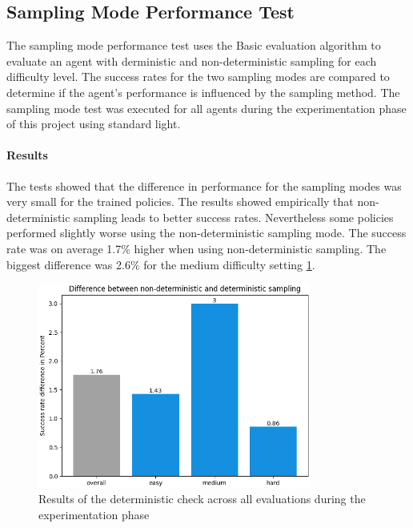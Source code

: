 \subsection{Sampling Mode Performance Test}
\label{ref:sampling_mode_test_results}

The sampling mode performance test uses the Basic evaluation algorithm to evaluate an agent with derministic and non-deterministic sampling for each difficulty level. The success rates for the two sampling modes are compared to determine if the agent's performance is influenced by the sampling method. The sampling mode test was executed for all agents during the experimentation phase of this project using standard light.

\paragraph{Results}
The tests showed that the difference in performance for the sampling modes was very small for the trained policies. The results showed empirically that non-deterministic sampling leads to better success rates. Nevertheless some policies performed slightly worse using the non-deterministic sampling mode. The success rate was on average 1.7\% higher when using non-deterministic sampling. The biggest difference was 2.6\% for the medium difficulty setting \ref{fig:deterministic_check_result}.

\begin{figure}
    \centering
    \includegraphics[width=0.8\textwidth]{Bilder/notebook_images/deterministic_check_results.png}
    \caption{Results of the deterministic check across all evaluations during the experimentation phase}
    \label{fig:deterministic_check_result}
\end{figure}

